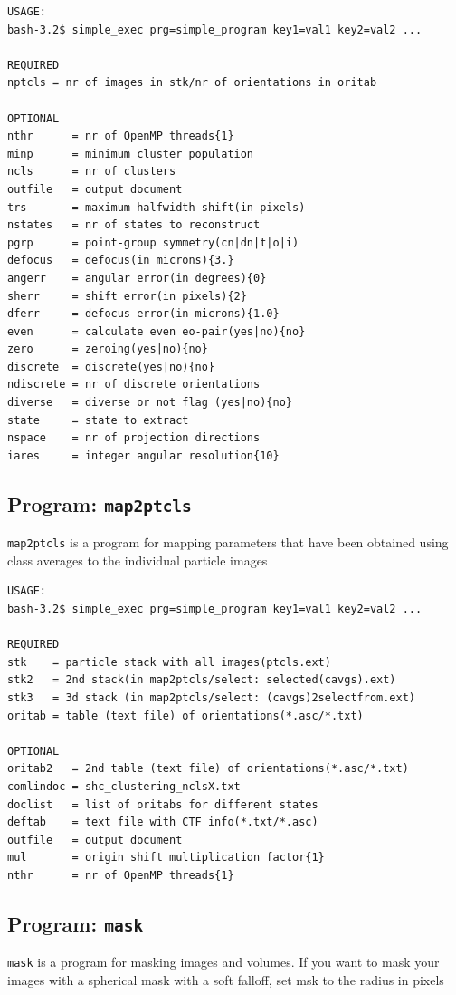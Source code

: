 \documentclass[a4paper,11pt]{article}
\newcommand{\prgname}[1]{\textcolor{NavyBlue}{\texttt{#1}}}
\begin{document}
\begin{verbatim}
USAGE:
bash-3.2$ simple_exec prg=simple_program key1=val1 key2=val2 ...

REQUIRED
nptcls = nr of images in stk/nr of orientations in oritab

OPTIONAL
nthr      = nr of OpenMP threads{1}
minp      = minimum cluster population
ncls      = nr of clusters
outfile   = output document
trs       = maximum halfwidth shift(in pixels)
nstates   = nr of states to reconstruct
pgrp      = point-group symmetry(cn|dn|t|o|i)
defocus   = defocus(in microns){3.}
angerr    = angular error(in degrees){0}
sherr     = shift error(in pixels){2}
dferr     = defocus error(in microns){1.0}
even      = calculate even eo-pair(yes|no){no}
zero      = zeroing(yes|no){no}
discrete  = discrete(yes|no){no}
ndiscrete = nr of discrete orientations
diverse   = diverse or not flag (yes|no){no}
state     = state to extract
nspace    = nr of projection directions
iares     = integer angular resolution{10}
\end{verbatim}

\subsection{Program: \prgname{map2ptcls}}
\label{map2ptcls}
\prgname{map2ptcls} is a program for mapping parameters that have been obtained using class averages to the individual particle images

\begin{verbatim}
USAGE:
bash-3.2$ simple_exec prg=simple_program key1=val1 key2=val2 ...

REQUIRED
stk    = particle stack with all images(ptcls.ext)
stk2   = 2nd stack(in map2ptcls/select: selected(cavgs).ext)
stk3   = 3d stack (in map2ptcls/select: (cavgs)2selectfrom.ext)
oritab = table (text file) of orientations(*.asc/*.txt)

OPTIONAL
oritab2   = 2nd table (text file) of orientations(*.asc/*.txt)
comlindoc = shc_clustering_nclsX.txt
doclist   = list of oritabs for different states
deftab    = text file with CTF info(*.txt/*.asc)
outfile   = output document
mul       = origin shift multiplication factor{1}
nthr      = nr of OpenMP threads{1}
\end{verbatim}

\subsection{Program: \prgname{mask}}
\label{mask}
\prgname{mask} is a program for masking images and volumes. If you want to mask your images with a spherical mask with a soft falloff, set msk to the radius in pixels
\end{document}

